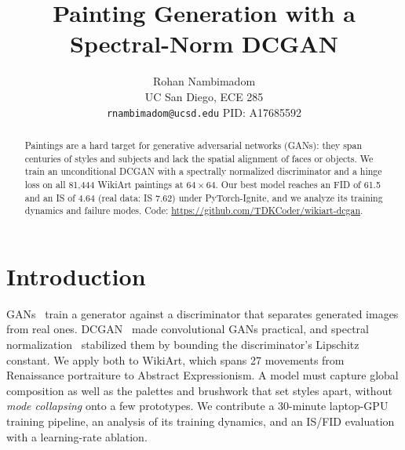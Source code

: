 \documentclass{article}
\title{Painting Generation with a Spectral-Norm DCGAN}
\author{%
  Rohan Nambimadom \\
  UC San Diego, ECE 285 \\
  \texttt{rnambimadom@ucsd.edu} \quad PID: A17685592
}
\begin{document}
\maketitle

\begin{abstract}
Paintings are a hard target for generative adversarial networks (GANs): they span centuries of styles and subjects and lack the spatial alignment of faces or objects. We train an unconditional DCGAN with a spectrally normalized discriminator and a hinge loss on all 81{,}444 WikiArt paintings at $64\times64$. Our best model reaches an FID of 61.5 and an IS of 4.64 (real data: IS 7.62) under PyTorch-Ignite, and we analyze its training dynamics and failure modes. Code: \url{https://github.com/TDKCoder/wikiart-dcgan}.
\end{abstract}

\section{Introduction}
GANs~\cite{goodfellow2014gan} train a generator against a discriminator that separates generated images from real ones. DCGAN~\cite{radford2016dcgan} made convolutional GANs practical, and spectral normalization~\cite{miyato2018sn} stabilized them by bounding the discriminator's Lipschitz constant. We apply both to WikiArt, which spans 27 movements from Renaissance portraiture to Abstract Expressionism. A model must capture global composition as well as the palettes and brushwork that set styles apart, without \emph{mode collapsing} onto a few prototypes. We contribute a 30-minute laptop-GPU training pipeline, an analysis of its training dynamics, and an IS/FID evaluation with a learning-rate ablation.
\end{document}
